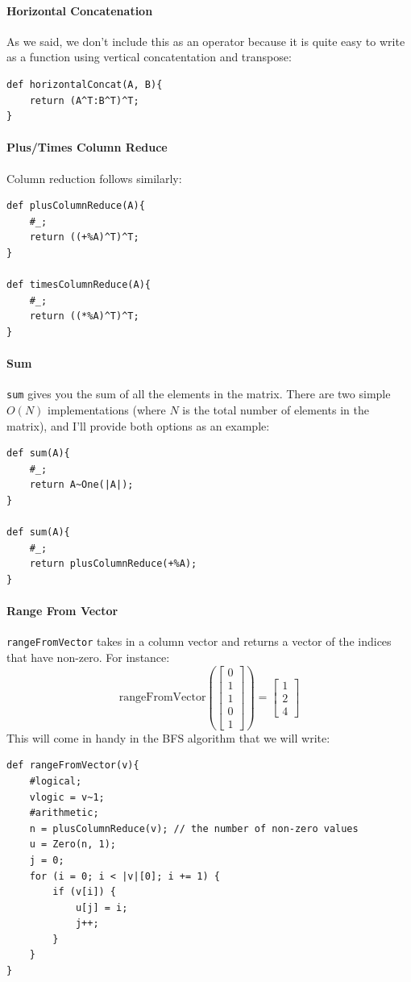 \paragraph{Horizontal Concatenation}
As we said, we don't include this as an operator because it is quite easy to write as a function using vertical concatentation and transpose:
\begin{lstlisting}
def horizontalConcat(A, B){
    return (A^T:B^T)^T;
}
\end{lstlisting}

\paragraph{Plus/Times Column Reduce}
Column reduction follows similarly:
\begin{lstlisting}
def plusColumnReduce(A){
    #_;
    return ((+%A)^T)^T;
}

def timesColumnReduce(A){
    #_;
    return ((*%A)^T)^T;
}
\end{lstlisting}

\paragraph{Sum}
\verb=sum= gives you the sum of all the elements in the matrix.  There are two simple $O(N)$ implementations (where $N$ is the total number of elements in the matrix), and I'll provide both options as an example:
\begin{lstlisting}
def sum(A){
    #_;
    return A~One(|A|);
}

def sum(A){
    #_;
    return plusColumnReduce(+%A);
}
\end{lstlisting}

\paragraph{Range From Vector}
\verb=rangeFromVector= takes in a column vector and returns a vector of the indices that have non-zero.  For instance:
$$\text{rangeFromVector}(\begin{bmatrix}
0 \\ 1 \\ 1 \\ 0 \\ 1
\end{bmatrix})
=
\begin{bmatrix}
1\\2\\4
\end{bmatrix}
$$
This will come in handy in the BFS algorithm that we will write:
\begin{lstlisting}
def rangeFromVector(v){
    #logical;
    vlogic = v~1;
    #arithmetic;
    n = plusColumnReduce(v); // the number of non-zero values
    u = Zero(n, 1);
    j = 0;
    for (i = 0; i < |v|[0]; i += 1) {
        if (v[i]) {
            u[j] = i;
            j++;
        }
    }
}
\end{lstlisting}



